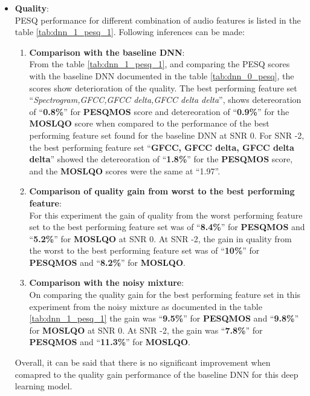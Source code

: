 \begin{enumerate}
\begin{itemize}
\item \textbf{Quality}:\\
PESQ performance for different combination of audio features is listed in
the table \ref{tab:dnn_1_pesq_1}. Following inferences can be made:\\
\begin{enumerate}
\item \textbf{Comparison with the baseline DNN}:\\
From the table \ref{tab:dnn_1_pesq_1}, and comparing the PESQ scores with the baseline DNN documented in the table \ref{tab:dnn_0_pesq}, the scores show deterioration of the quality. The best performing feature set \enquote{\textit{Spectrogram,GFCC,GFCC delta,GFCC delta delta}}, shows detereoration of \enquote{\textbf{0.8\%}} for \textbf{PESQMOS} score and detereoration of \enquote{\textbf{0.9\%}} for the \textbf{MOSLQO} score when compared to the performance of the best performing feature set found for the baseline DNN at SNR 0. For SNR -2, the best performing feature set \enquote{\textbf{GFCC, GFCC delta, GFCC delta delta}} showed the detereoration of \enquote{\textbf{1.8\%}} for the \textbf{PESQMOS} score, and the \textbf{MOSLQO} scores were the same at \enquote{1.97}.
\item \textbf{Comparison of quality gain from worst to the best performing feature}:\\
For this experiment the gain of quality from the worst performing feature set to the best performing feature set was of \enquote{\textbf{8.4\%}} for \textbf{PESQMOS} and \enquote{\textbf{5.2\%}} for \textbf{MOSLQO} at SNR 0. At SNR -2, the gain in quality from the worst to the best performing feature set was of \enquote{\textbf{10\%}} for \textbf{PESQMOS} and \enquote{\textbf{8.2\%}} for \textbf{MOSLQO}.
\item \textbf{Comparison with the noisy mixture}:\\
On comparing the quality gain for the best performing feature set in this experiment from the noisy mixture as documented in the table \ref{tab:dnn_1_pesq_1} the gain was \enquote{\textbf{9.5\%}} for \textbf{PESQMOS} and \enquote{\textbf{9.8\%}} for \textbf{MOSLQO} at SNR 0. At SNR -2, the gain was \enquote{\textbf{7.8\%}} for \textbf{PESQMOS} and \enquote{\textbf{11.3\%}} for \textbf{MOSLQO}.
\end{enumerate}
Overall, it can be said that there is no significant improvement when comapred to the quality gain performance of the baseline DNN for this deep learning model.
\begin{table}[!htbp]

\end{table}
\end{itemize}
\end{enumerate}
